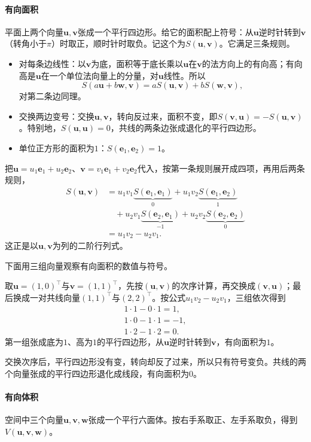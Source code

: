 \paragraph{有向面积}
平面上两个向量$\bm u,\bm v$张成一个平行四边形。给它的面积配上符号：从$\bm u$逆时针转到$\bm v$（转角小于$\pi$）时取正，顺时针时取负。记这个为$S(\bm u,\bm v)$。它满足三条规则。
\begin{itemize}
 \item 对每条边线性：以$\bm v$为底，面积等于底长乘以$\bm u$在$\bm v$的法方向上的有向高；有向高是$\bm u$在一个单位法向量上的分量，对$\bm u$线性。所以
 \[
  S(a\bm u+b\bm w,\bm v)=aS(\bm u,\bm v)+bS(\bm w,\bm v),
 \]
 对第二条边同理。
 \item 交换两边变号：交换$\bm u,\bm v$，转向反过来，面积不变，即$S(\bm v,\bm u)=-S(\bm u,\bm v)$。特别地，$S(\bm u,\bm u)=0$，共线的两条边张成退化的平行四边形。
 \item 单位正方形的面积为$1$：$S(\bm e_1,\bm e_2)=1$。
\end{itemize}
把$\bm u=u_1\bm e_1+u_2\bm e_2$、$\bm v=v_1\bm e_1+v_2\bm e_2$代入，按第一条规则展开成四项，再用后两条规则，
\[
 \begin{aligned}
 S(\bm u,\bm v)
 &=u_1v_1\underbrace{S(\bm e_1,\bm e_1)}_{0}+u_1v_2\underbrace{S(\bm e_1,\bm e_2)}_{1}\\
 &\quad+u_2v_1\underbrace{S(\bm e_2,\bm e_1)}_{-1}+u_2v_2\underbrace{S(\bm e_2,\bm e_2)}_{0}\\
 &=u_1v_2-u_2v_1.
 \end{aligned}
\]
这正是以$\bm u,\bm v$为列的二阶行列式。

下面用三组向量观察有向面积的数值与符号。
\begin{example}[平面上的有向面积]
\label{ex:ls-oriented-area}
取$\bm u=(1,0)^\top$与$\bm v=(1,1)^\top$，先按$(\bm u,\bm v)$的次序计算，再交换成$(\bm v,\bm u)$；最后换成一对共线向量$(1,1)^\top$与$(2,2)^\top$。按公式$u_1v_2-u_2v_1$，三组依次得到
\[
 \begin{gathered}
1\cdot1-0\cdot1=1,\\
1\cdot0-1\cdot1=-1,\\
1\cdot2-1\cdot2=0.
 \end{gathered}
\]
第一组张成底为$1$、高为$1$的平行四边形，从$\bm u$逆时针转到$\bm v$，有向面积为$1$。

交换次序后，平行四边形没有变，转向却反了过来，所以只有符号变负。共线的两个向量张成的平行四边形退化成线段，有向面积为$0$。
\end{example}

\paragraph{有向体积}
空间中三个向量$\bm u,\bm v,\bm w$张成一个平行六面体。按右手系取正、左手系取负，得到$V(\bm u,\bm v,\bm w)$。


